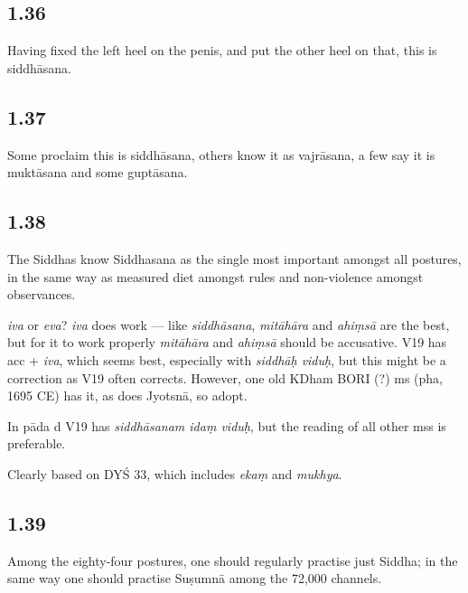 \begin{ekdosis}
\subsection*{1.36}
\begin{translation}[hp01_036]
Having fixed the left heel on the penis, and put the other heel on that, this is siddhāsana. 
\end{translation}

\subsection*{1.37}
\begin{translation}[hp01_037]
Some proclaim this is siddhāsana, others know it as vajrāsana, a few say it is muktāsana and some guptāsana.
\end{translation}

\subsection*{1.38}
\begin{translation}[hp01_038]
The Siddhas know Siddhasana as the single most important amongst
all postures, in the same way as measured diet amongst rules and non-violence amongst observances. 
\end{translation}

\begin{philcomm}[hp01_038]
\emph{iva} or \emph{eva}? \emph{iva} does work — like \emph{siddhāsana}, \emph{mitāhāra} and \emph{ahiṃsā} are the best, but for it to work properly \emph{mitāhāra} and \emph{ahiṃsā} should be accusative. V19 has acc + \emph{iva}, which seems best, especially with \emph{siddhāḥ viduḥ}, but this might be a correction as V19 often corrects. However, one old KDham BORI (?) ms (pha, 1695 CE) has it, as does Jyotsnā, so adopt.

In pāda d V19 has \emph{siddhāsanam idaṃ viduḥ}, but the reading of all other mss is preferable.

Clearly based on DYŚ 33, which includes \emph{ekaṃ} and \emph{mukhya}.
\end{philcomm}

\subsection*{1.39}
\begin{translation}[hp01_039]
Among the eighty-four postures, one should regularly practise just Siddha; in the same way one should practise Suṣumnā among the 72,000 channels.
\end{translation}


\end{ekdosis}
